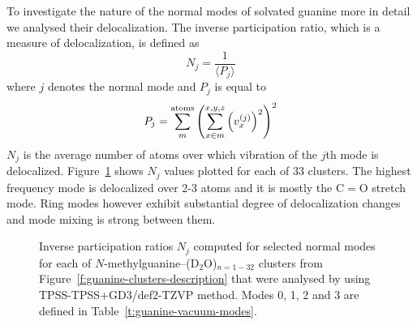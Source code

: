 \documentclass[a4paper,titlepage,twoside,fleqn,12pt]{book}
\begin{document}
\begin{refsection}
To investigate the nature of the normal modes of solvated guanine
more in detail we analysed their delocalization. The inverse
participation ratio, which is a measure of delocalization, 
is defined as 
%
\begin{equation}  \label{e:ipr}
 N_j = \frac{1}{\langle P_j \rangle}
\end{equation}
%
where $j$ denotes the normal mode and $P_j$
is equal to
%
\begin{equation}  
 P_j = \sum_m^{\rm atoms} \left( 
         \sum_{x \in m}^{x,y,z} \left( v^{(j)}_x \right)^2
              \right)^2
\end{equation}
%
$N_j$ is the average number of atoms over which vibration of the $j$th
mode is delocalized. Figure~\ref{f:guanine-clusters-ipr} shows $N_j$ values
plotted for each of 33 clusters. The highest frequency mode
is delocalized over 2-3 atoms and it is mostly the C$=$O stretch mode.
Ring modes however exhibit substantial degree of delocalization changes
and mode mixing is strong between them.
%
\begin{figure}[t!]
\centering
\setlength\fboxsep{0.4pt}
\setlength\fboxrule{0.5pt}
\caption{
Inverse participation ratios $N_j$ computed for selected normal modes
for each of
$N$-methylguanine--(D$_2$O)$_{n=1-32}$ clusters from 
Figure~\ref{f:guanine-clusters-description} that were analysed
by using TPSS-TPSS+GD3/def2-TZVP method. Modes 0, 1, 2 and 3
are defined in Table~\ref{t:guanine-vacuum-modes}.
\label{f:guanine-clusters-ipr}}
\end{figure}
%


\end{refsection}
\end{document}
